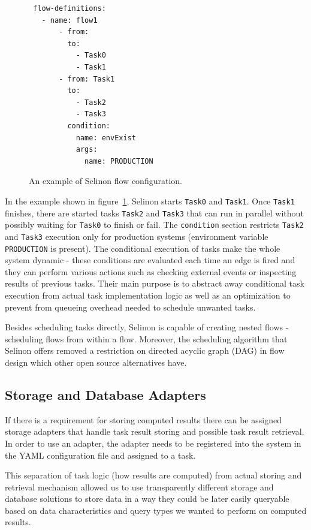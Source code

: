 \documentclass[a4paper]{llncs}
\begin{document}
\begin{figure}[h!]
\begin{verbatim}
 flow-definitions:
   - name: flow1
       - from:
         to:
           - Task0
           - Task1
       - from: Task1
         to:
           - Task2
           - Task3
         condition:
           name: envExist
           args:
             name: PRODUCTION
\end{verbatim}
  \caption{An example of Selinon flow configuration.}
  \label{conf_flow}
\end{figure}

In the example shown in figure~\ref{conf_flow}, Selinon starts \texttt{Task0} and \texttt{Task1}. Once \texttt{Task1} finishes, there are started tasks \texttt{Task2} and \texttt{Task3} that can run in parallel without possibly waiting for \texttt{Task0} to finish or fail. The \texttt{condition} section restricts \texttt{Task2} and \texttt{Task3} execution only for production systems (environment variable \texttt{PRODUCTION} is present). The conditional execution of tasks make the whole system dynamic - these conditions are evaluated each time an edge is fired and they can perform various actions such as checking external events or inspecting results of previous tasks. Their main purpose is to abstract away conditional task execution from actual task implementation logic as well as an optimization to prevent from queueing overhead needed to schedule unwanted tasks.

Besides scheduling tasks directly, Selinon is capable of creating nested flows - scheduling flows from within a flow. Moreover, the scheduling algorithm that Selinon offers removed a restriction on directed acyclic graph (DAG) in flow design which other open source alternatives have.

\subsection{Storage and Database Adapters} \label{subsection_storage}

If there is a requirement for storing computed results there can be assigned storage adapters that handle task result storing and possible task result retrieval. In order to use an adapter, the adapter needs to be registered into the system in the YAML configuration file and assigned to a task.

This separation of task logic (how results are computed) from actual storing and retrieval mechanism allowed us to use transparently different storage and database solutions to store data in a way they could be later easily queryable based on data characteristics and query types we wanted to perform on computed results.
\end{document}

